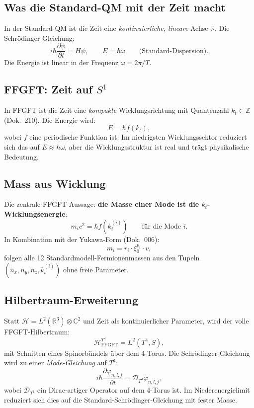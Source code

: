 \subsection{Was die Standard-QM mit der Zeit macht}

In der Standard-QM ist die Zeit eine \emph{kontinuierliche, lineare}
Achse $\mathbb{R}$. Die Schrödinger-Gleichung:
\begin{equation}
  i\hbar \frac{\partial \psi}{\partial t} = H \psi,
  \qquad
  E = \hbar \omega
  \qquad \text{(Standard-Dispersion)}.
\end{equation}
Die Energie ist linear in der Frequenz $\omega = 2\pi/T$.

\subsection{FFGFT: Zeit auf $S^1$}

In FFGFT ist die Zeit eine \emph{kompakte} Wicklungsrichtung mit
Quantenzahl $k_t \in \mathbb{Z}$ (Dok.~210). Die Energie wird:
\begin{equation}
  \boxed{
    E = \hbar f(k_t),
  }
\end{equation}
wobei $f$ eine periodische Funktion ist. Im niedrigsten
Wicklungssektor reduziert sich das auf $E \approx \hbar \omega$, aber
die Wicklungsstruktur ist real und trägt physikalische Bedeutung.

\subsection{Mass aus Wicklung}

Die zentrale FFGFT-Aussage: \textbf{die Masse einer Mode ist die
$k_t$-Wicklungsenergie}:
\begin{equation}
  m_i c^2 = \hbar f(k_t^{(i)})
  \qquad \text{für die Mode $i$}.
\end{equation}
In Kombination mit der Yukawa-Form (Dok.~006):
\begin{equation}
  m_i = r_i \cdot \xi_0^{p_i} \cdot v,
\end{equation}
folgen alle 12 Standardmodell-Fermionenmassen aus den Tupeln
$(n_x, n_y, n_z, k_t^{(i)})$ ohne freie Parameter.

\subsection{Hilbertraum-Erweiterung}

Statt $\mathcal{H} = L^2(\mathbb{R}^3) \otimes \mathbb{C}^2$ und Zeit
als kontinuierlicher Parameter, wird der volle FFGFT-Hilbertraum:
\begin{equation}
  \mathcal{H}^{T^4}_{\text{FFGFT}} = L^2(T^4, S),
\end{equation}
mit Schnitten eines Spinorbündels über dem 4-Torus. Die
Schrödinger-Gleichung wird zu einer \emph{Mode-Gleichung} auf $T^4$:
\begin{equation}
  i\hbar \frac{\partial \varphi_{n,l,j}}{\partial t}
  = \mathcal{D}_{T^4} \varphi_{n,l,j},
\end{equation}
wobei $\mathcal{D}_{T^4}$ ein Dirac-artiger Operator auf dem 4-Torus
ist. Im Niederenergielimit reduziert sich dies auf die
Standard-Schrödinger-Gleichung mit fester Masse.

